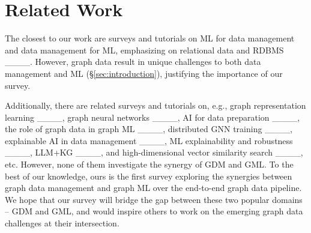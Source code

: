 \section{Related Work}
\label{sec:related}

\medskip
\medskip

The closest to our work are surveys and tutorials on ML for data management
and data management for ML, emphasizing on relational
data and RDBMS ____.
However, graph data result in unique challenges to both data management and ML (\S\ref{sec:introduction}), justifying the importance of our survey.


Additionally, there are related surveys and tutorials on, e.g., graph representation learning ____, graph neural networks ____, AI for data preparation ____, the role of graph data in graph ML ____, distributed GNN training ____, explainable AI in data management ____, ML explainability and robustness ____, LLM+KG ____, and high-dimensional vector similarity search ____, etc.
However, none of them investigate the synergy of GDM and GML. To the best of our knowledge, ours is the first survey exploring the synergies between graph data management and graph ML over the end-to-end graph data pipeline. We hope that our survey will bridge the gap between these two popular domains -- GDM and GML, and would inspire others to work on the emerging graph data challenges at their intersection.